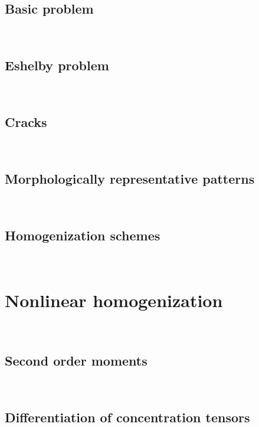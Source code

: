 \documentclass[
  letterpaper,
  DIV=11,
  numbers=noendperiod]{scrreprt}
\begin{document}
\hypertarget{sec-basics_cond}{%
\chapter{Basic problem}\label{sec-basics_cond}}

\(\,\)

\hypertarget{sec-eshelby_cond}{%
\chapter{Eshelby problem}\label{sec-eshelby_cond}}

\(\,\)

\hypertarget{sec-cracks_cond}{%
\chapter{Cracks}\label{sec-cracks_cond}}

\(\,\)

\hypertarget{sec-mrp_cond}{%
\chapter{Morphologically representative patterns}\label{sec-mrp_cond}}

\(\,\)

\hypertarget{sec-schemes_cond}{%
\chapter{Homogenization schemes}\label{sec-schemes_cond}}

\(\,\)

\part{Nonlinear homogenization}

\(\,\)

\hypertarget{sec-second_order_moments}{%
\chapter{Second order moments}\label{sec-second_order_moments}}

\(\,\)

\hypertarget{sec-conc_tensor_deriv}{%
\chapter{Differentiation of concentration
tensors}\label{sec-conc_tensor_deriv}}
\end{document}
